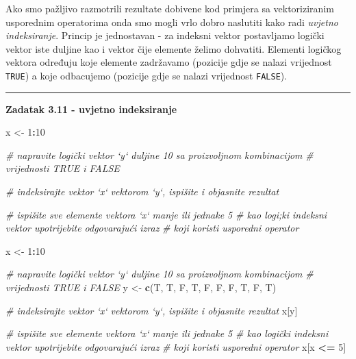 \documentclass[]{book}
\newenvironment{Shaded}{\begin{snugshade}}{\end{snugshade}}
\newcommand{\KeywordTok}[1]{\textcolor[rgb]{0.13,0.29,0.53}{\textbf{#1}}}
\newcommand{\DecValTok}[1]{\textcolor[rgb]{0.00,0.00,0.81}{#1}}
\newcommand{\StringTok}[1]{\textcolor[rgb]{0.31,0.60,0.02}{#1}}
\newcommand{\CommentTok}[1]{\textcolor[rgb]{0.56,0.35,0.01}{\textit{#1}}}
\newcommand{\OperatorTok}[1]{\textcolor[rgb]{0.81,0.36,0.00}{\textbf{#1}}}
\newcommand{\NormalTok}[1]{#1}
\theoremstyle{definition}
\theoremstyle{definition}
\theoremstyle{definition}
\theoremstyle{remark}
\begin{document}
Ako smo pažljivo razmotrili rezultate dobivene kod primjera sa
vektoriziranim usporednim operatorima onda smo mogli vrlo dobro
naslutiti kako radi \emph{uvjetno indeksiranje}. Princip je jednostavan
- za indeksni vektor postavljamo logički vektor iste duljine kao i
vektor čije elemente želimo dohvatiti. Elementi logičkog vektora
određuju koje elemente zadržavamo (pozicije gdje se nalazi vrijednost
\texttt{TRUE}) a koje odbacujemo (pozicije gdje se nalazi vrijednost
\texttt{FALSE}).

\begin{center}\rule{0.5\linewidth}{\linethickness}\end{center}

\textbf{Zadatak 3.11 - uvjetno indeksiranje}

\begin{Shaded}
\begin{Highlighting}[]
\NormalTok{x <-}\StringTok{ }\DecValTok{1}\OperatorTok{:}\DecValTok{10}

\CommentTok{# napravite logički vektor `y` duljine 10 sa proizvoljnom kombinacijom}
\CommentTok{# vrijednosti TRUE i FALSE}

\CommentTok{# indeksirajte vektor `x` vektorom `y`, ispišite i objasnite rezultat}


\CommentTok{# ispišite sve elemente vektora `x` manje ili jednake 5}
\CommentTok{# kao logi;ki indeksni vektor upotrijebite odgovarajući izraz}
\CommentTok{# koji koristi usporedni operator}
\end{Highlighting}
\end{Shaded}

\begin{Shaded}
\begin{Highlighting}[]
\NormalTok{x <-}\StringTok{ }\DecValTok{1}\OperatorTok{:}\DecValTok{10}

\CommentTok{# napravite logički vektor `y` duljine 10 sa proizvoljnom kombinacijom}
\CommentTok{# vrijednosti TRUE i FALSE}
\NormalTok{y <-}\StringTok{ }\KeywordTok{c}\NormalTok{(T, T, F, T, F, F, F, T, F, T)}

\CommentTok{# indeksirajte vektor `x` vektorom `y`, ispišite i objasnite rezultat}
\NormalTok{x[y]}

\CommentTok{# ispišite sve elemente vektora `x` manje ili jednake 5}
\CommentTok{# kao logički indeksni vektor upotrijebite odgovarajući izraz}
\CommentTok{# koji koristi usporedni operator}
\NormalTok{x[x }\OperatorTok{<=}\StringTok{ }\DecValTok{5}\NormalTok{]}
\end{Highlighting}
\end{Shaded}
\end{document}
